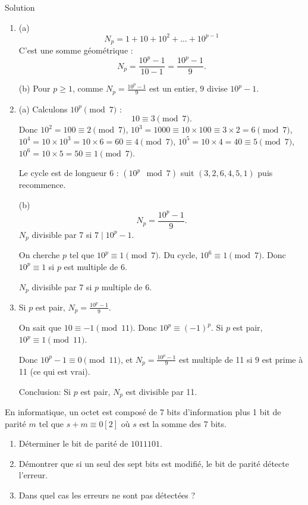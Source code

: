 \documentclass[a4paper,12pt]{article}
\begin{document}
\begin{solutionbox}{Solution}
\begin{enumerate}
    \item (a) 
    \[
    N_p=1+10+10^2+\dots+10^{p-1}
    \]
    C’est une somme géométrique :
    \[
    N_p=\frac{10^p -1}{10-1}=\frac{10^p -1}{9}.
    \]

    (b) Pour $p\geq 1$, comme $N_p=\frac{10^p -1}{9}$ est un entier, $9$ divise $10^p-1$.

    \item (a)
    Calculons $10^p \pmod{7}$ :
    \[
    10 \equiv 3 \pmod{7}.
    \]
    Donc $10^2=100\equiv 2 \pmod{7}$,  
    $10^3=1000 \equiv 10 \times 100 \equiv 3 \times 2=6 \pmod{7}$,
    $10^4=10 \times 10^3=10 \times 6=60 \equiv 4 \pmod{7}$,
    $10^5=10 \times 4=40\equiv 5 \pmod{7}$,
    $10^6=10 \times 5=50\equiv 1 \pmod{7}$.

    Le cycle est de longueur 6 : $(10^p \mod 7)$ suit $(3,2,6,4,5,1)$ puis recommence.

    (b) 
    \[
    N_p=\frac{10^p -1}{9}.
    \]
    $N_p$ divisible par 7 si $7 \mid 10^p-1$.

    On cherche $p$ tel que $10^p \equiv 1 \pmod{7}$.  
    Du cycle, $10^6 \equiv 1 \pmod{7}$.
    Donc $10^p\equiv 1$ si $p$ est multiple de 6.

    $N_p$ divisible par 7 si $p$ multiple de 6.

    \item Si $p$ est pair,  
    $N_p=\frac{10^p -1}{9}$.

    On sait que $10 \equiv -1 \pmod{11}$.
    Donc $10^p \equiv (-1)^p$. Si $p$ est pair, $10^p \equiv 1 \pmod{11}$.

    Donc $10^p -1 \equiv 0 \pmod{11}$,  
    et $N_p=\frac{10^p -1}{9}$ est multiple de 11 si $9$ est prime à 11 (ce qui est vrai).

    Conclusion: Si $p$ est pair, $N_p$ est divisible par 11.
\end{enumerate}
\end{solutionbox}

\begin{exercice}[title=Exercice 29 $\quad \star \star \quad$ { [Modéliser, Chercher]}]{}{}
En informatique, un octet est composé de 7 bits d’information plus 1 bit de parité $m$ tel que $s+m \equiv 0[2]$ où $s$ est la somme des 7 bits.
\begin{enumerate}
    \item Déterminer le bit de parité de $1011101$.
    \item Démontrer que si un seul des sept bits est modifié, le bit de parité détecte l’erreur.
    \item Dans quel cas les erreurs ne sont pas détectées ?
\end{enumerate}
\end{exercice}
\end{document}
